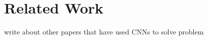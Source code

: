 \chapter{Related Work}
\label{ch:related-work}

write about other papers that have used CNNs to solve problem




